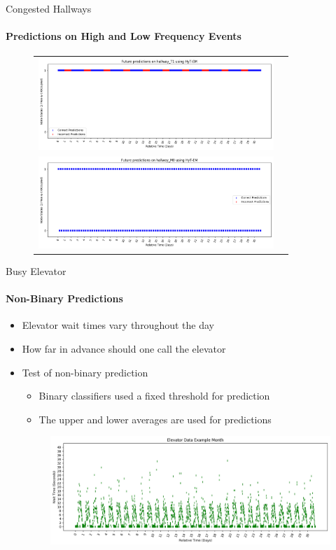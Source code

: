 \documentclass{beamer}
\begin{document}
\begin{frame}[t]{Congested Hallways}
\framesubtitle{Predictions on High and Low Frequency Events}
  \vspace*{-0.5cm}
\begin{figure}[!Hp]
  \begin{tabular}{cc}
    {\includegraphics[width = 3.5in]{images/results/Future_hallway_T1_HyT-EM.png}} \\
    {\includegraphics[width = 3.5in]{images/results/Future_hallway_M0_HyT-EM.png}} \\
  \end{tabular}
\end{figure}
\end{frame}



\begin{frame}[t]{Busy Elevator}
  \framesubtitle{Non-Binary Predictions}

  \begin{itemize}
    \setlength\itemsep{.3em}
  \item Elevator wait times vary throughout the day
  \item How far in advance should one call the elevator
  \item Test of non-binary prediction
  \begin{itemize}
    \item Binary classifiers used a fixed threshold for prediction
    \item The upper and lower averages are used for predictions
  \end{itemize}

  \begin{figure}[!htb]
    \centering
    \includegraphics[width=\linewidth]{images/Elevator_Data_Example_Month.png}
  \end{figure}

  \end{itemize}
\end{frame}
\end{document}
